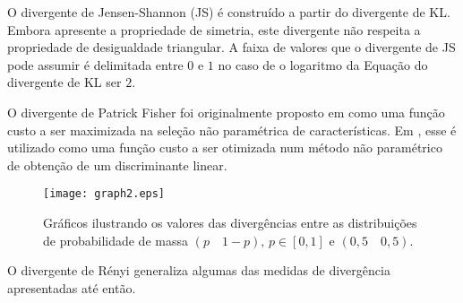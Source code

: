 
O divergente de Jensen-Shannon (JS) é construído a partir do divergente de KL. Embora apresente a propriedade de simetria, este divergente não respeita a propriedade de desigualdade triangular. A faixa de valores que o divergente de JS  pode assumir é delimitada entre $0$ e $1$ no caso de o logaritmo da Equação do divergente de KL ser $2$.
 
\begin{comment}
$D_{JS}(p,q) =\frac{1}{2}(D_{KL}(p,h)+D_{KL}(q,h))$, sendo $h = \frac{p+q}{2}$
\end{comment}


O divergente de Patrick Fisher foi originalmente proposto em  como uma função custo a ser maximizada na seleção não paramétrica de características. Em \cite{662771}, esse é utilizado como uma função custo a ser otimizada num método não paramétrico de obtenção de um discriminante linear.  

\begin{comment}
$D_{PF}(p,q) = \sqrt{\sum\limits_{i=1}^{n}{(p_i-q_i)}^2}$
\end{comment}


\begin{figure}[h!]
  \caption{\label{fig:graph2} Gráficos ilustrando os valores das divergências entre as distribuições de probabilidade de massa $(p\quad1-p)\text{, } p \in [0,1]$ e $(0,5\quad0,5)$.}
  \centering
  \texttt{[image: graph2.eps]}
\end{figure}

O divergente de Rényi generaliza algumas das medidas de divergência apresentadas até então.

